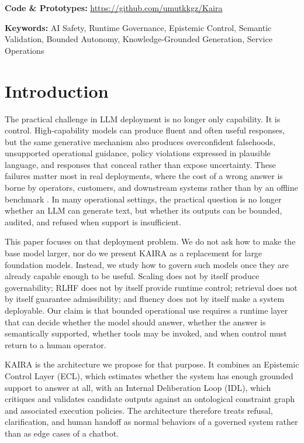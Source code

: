 \documentclass[11pt,a4paper]{article}
\begin{document}
\vspace{0.5em}
\noindent \textbf{Code \& Prototypes:} \url{https://github.com/umutkkgz/Kaira}

\textbf{Keywords:} AI Safety, Runtime Governance, Epistemic Control, Semantic Validation, Bounded Autonomy, Knowledge-Grounded Generation, Service Operations

\section{Introduction}

The practical challenge in LLM deployment is no longer only capability. It is control. High-capability models can produce fluent and often useful responses, but the same generative mechanism also produces overconfident falsehoods, unsupported operational guidance, policy violations expressed in plausible language, and responses that conceal rather than expose uncertainty. These failures matter most in real deployments, where the cost of a wrong answer is borne by operators, customers, and downstream systems rather than by an offline benchmark \cite{kadavath2022}. In many operational settings, the practical question is no longer whether an LLM can generate text, but whether its outputs can be bounded, audited, and refused when support is insufficient.

This paper focuses on that deployment problem. We do not ask how to make the base model larger, nor do we present KAIRA as a replacement for large foundation models. Instead, we study how to govern such models once they are already capable enough to be useful. Scaling does not by itself produce governability; RLHF does not by itself provide runtime control; retrieval does not by itself guarantee admissibility; and fluency does not by itself make a system deployable. Our claim is that bounded operational use requires a runtime layer that can decide whether the model should answer, whether the answer is semantically supported, whether tools may be invoked, and when control must return to a human operator.

KAIRA is the architecture we propose for that purpose. It combines an Epistemic Control Layer (ECL), which estimates whether the system has enough grounded support to answer at all, with an Internal Deliberation Loop (IDL), which critiques and validates candidate outputs against an ontological constraint graph and associated execution policies. The architecture therefore treats refusal, clarification, and human handoff as normal behaviors of a governed system rather than as edge cases of a chatbot.
\end{document}

